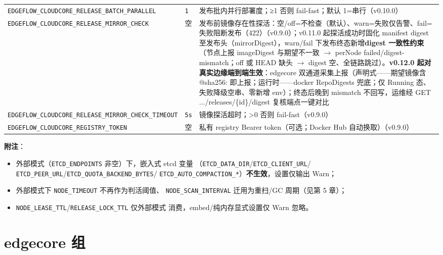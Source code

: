 \begin{table}[htbp]
\begin{tabularx}{\textwidth}{l l X}
\texttt{EDGEFLOW\_CLOUDCORE\_RELEASE\_BATCH\_PARALLEL} & \texttt{1} & 发布批内并行部署度；≥1 否则 fail-fast；默认 1=串行（v0.10.0） \\
\texttt{EDGEFLOW\_CLOUDCORE\_RELEASE\_MIRROR\_CHECK} & 空 & 发布前镜像存在性探活：空/off=不检查（默认）、warn=失败仅告警、fail=失败阻断发布（422）（v0.9.0）；v0.11.0 起探活成功时固化 manifest digest 至发布头（mirrorDigest），warn/fail 下发布终态新增\textbf{digest 一致性约束}（节点上报 imageDigest 与期望不一致 $\rightarrow$ perNode failed/digest-mismatch；off 或 HEAD 缺头 $\rightarrow$ digest 空、全链路跳过）。\textbf{v0.12.0 起对真实边缘端到端生效}：edgecore 双通道采集上报（声明式——期望镜像含 @sha256: 即上报；运行时——docker RepoDigests 兜底；仅 Running 态、失败降级空串、零新增 env）；终态后晚到 mismatch 不回写，运维经 GET .../releases/\{id\}/digest 复核端点一键对比 \\
\texttt{EDGEFLOW\_CLOUDCORE\_RELEASE\_MIRROR\_CHECK\_TIMEOUT} & \texttt{5s} & 镜像探活超时；>0 否则 fail-fast（v0.9.0） \\
\texttt{EDGEFLOW\_CLOUDCORE\_REGISTRY\_TOKEN} & 空 & 私有 registry Bearer token（可选；Docker Hub 自动换取）（v0.9.0） \\
\bottomrule
\end{tabularx}
\end{table}

\textbf{附注}：
\begin{itemize}
  \item 外部模式（\texttt{ETCD\_ENDPOINTS} 非空）下，嵌入式 etcd 变量
        （\texttt{ETCD\_DATA\_DIR}/\texttt{ETCD\_CLIENT\_URL}/
        \texttt{ETCD\_PEER\_URL}/\texttt{ETCD\_QUOTA\_BACKEND\_BYTES}/
        \texttt{ETCD\_AUTO\_COMPACTION\_*}）\textbf{不生效}，设置仅输出 Warn；
  \item 外部模式下 \texttt{NODE\_TIMEOUT} 不再作为判活阈值、
        \texttt{NODE\_SCAN\_INTERVAL} 迁用为重扫/GC 周期（见第 5 章）；
  \item \texttt{NODE\_LEASE\_TTL}/\texttt{RELEASE\_LOCK\_TTL} 仅外部模式
        消费，embed/纯内存显式设置仅 Warn 忽略。
\end{itemize}

\section{edgecore 组}

